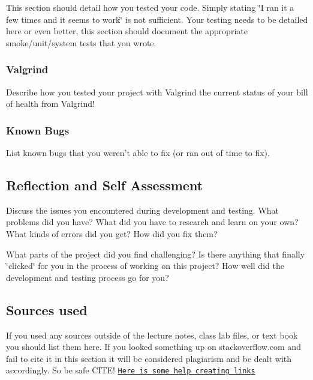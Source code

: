 This section should detail how you tested your code. Simply stating \char`\"{}\-I ran
it a few times and it seems to work\char`\"{} is not sufficient. Your testing needs to be detailed here or even better, this section should document the appropriate smoke/unit/system tests that you wrote.

\subsubsection*{Valgrind}

Describe how you tested your project with Valgrind the current status of your bill of health from Valgrind!

\subsubsection*{Known Bugs}

List known bugs that you weren't able to fix (or ran out of time to fix).

\subsection*{Reflection and Self Assessment}

Discuss the issues you encountered during development and testing. What problems did you have? What did you have to research and learn on your own? What kinds of errors did you get? How did you fix them?

What parts of the project did you find challenging? Is there anything that finally \char`\"{}clicked\char`\"{} for you in the process of working on this project? How well did the development and testing process go for you?

\subsection*{Sources used}

If you used any sources outside of the lecture notes, class lab files, or text book you should list them here. If you looked something up on stackoverflow.\-com and fail to cite it in this section it will be considered plagiarism and be dealt with accordingly. So be safe C\-I\-T\-E! \href{https://github.com/adam-p/markdown-here/wiki/Markdown-Cheatsheet#links}{\tt Here is some help creating links} 